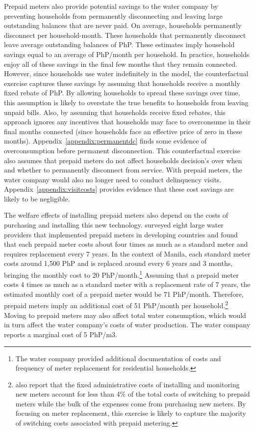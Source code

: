 \documentclass[12pt]{article}
\begin{document}
Prepaid meters also provide potential savings to the water company by preventing households from permanently disconnecting and leaving large outstanding balances that are never paid.  On average, households permanently disconnect per household-month.  These households that permanently disconnect leave average outstanding balances of PhP.  These estimates imply household savings equal to an average of PhP/month per household.  In practice, households enjoy all of these savings in the final few months that they remain connected.  However, since households use water indefinitely in the model, the counterfactual exercise captures these savings by assuming that households receive a monthly fixed rebate of PhP.  By allowing households to spread these savings over time, this assumption is likely to overstate the true benefits to households from leaving unpaid bills.  Also, by assuming that households receive fixed rebates, this approach ignores any incentives that households may face to overconsume in their final months connected (since households face an effective price of zero in these months).  Appendix~\ref{appendix:permanentdc} finds some evidence of overconsumption before permanent disconnection.  This counterfactual exercise also assumes that prepaid meters do not affect households decision's over when and whether to permanently disconnect from service.  With prepaid meters, the water company would also no longer need to conduct delinquency visits.  Appendix~\ref{appendix:visitcosts} provides evidence that these cost savings are likely to be negligible.

The welfare effects of installing prepaid meters also depend on the costs of purchasing and installing this new technology.  \cite{heymans2014limits} surveyed eight large water providers that implemented prepaid meters in developing countries and found that each prepaid meter costs about four times as much as a standard meter and requires replacement every 7 years.  In the context of Manila, each standard meter costs around 1,500 PhP and is replaced around every 6 years and 3 months, bringing the monthly cost to 20 PhP/month.\footnote{The water company provided additional documentation of costs and frequency of meter replacement for residential households.}  Assuming that a prepaid meter costs 4 times as much as a standard meter with a replacement rate of 7 years, the estimated monthly cost of a prepaid meter would be 71 PhP/month.  Therefore, prepaid meters imply an additional cost of 51 PhP/month per household.\footnote{\cite{heymans2014limits} also report that the fixed administrative costs of installing and monitoring new meters account for less than 4\% of the total costs of switching to prepaid meters while the bulk of the expenses come from purchasing new meters.  By focusing on meter replacement, this exercise is likely to capture the majority of switching costs associated with prepaid metering.}  Moving to prepaid meters may also affect total water consumption, which would in turn affect the water company's costs of water production.  The water company reports a marginal cost of 5 PhP/m3.  
\end{document}
